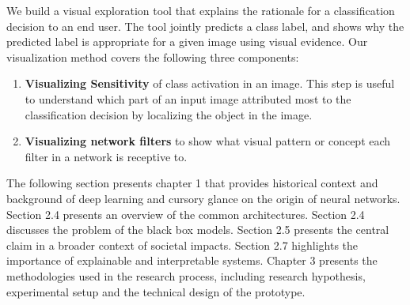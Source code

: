 We build a visual exploration tool that explains the rationale for a classification decision to an end user. The tool jointly predicts a class label,  and shows why the predicted label is appropriate for a given image using visual evidence. Our visualization method covers the following three components:

\begin{itemize}
\begin{enumerate}
\item \textbf{Visualizing  Sensitivity} of class activation in an image. This step is useful to understand which part of an input image attributed most to the classification decision by localizing the object in the image.

\item \textbf{Visualizing network filters} to show what visual pattern or concept each filter in a network is receptive to.

\iffalse
\item  \textbf{Visualizing intermediate outputs}: It helps a user understands how successive layers transform their input, and to get an insight into the individual network filters.
\fi

\end{enumerate}
\end{itemize}

The following section presents chapter 1 that provides historical context and background of deep learning and cursory glance on the origin of neural networks.  Section 2.4 presents an overview of the common architectures.  Section 2.4 discusses the problem of the black box models.  Section 2.5 presents the central claim in a broader context of societal impacts.  Section 2.7 highlights the importance of explainable and interpretable systems.  Chapter 3 presents the methodologies used in the research process, including research hypothesis, experimental setup and the technical design of the prototype.

  



